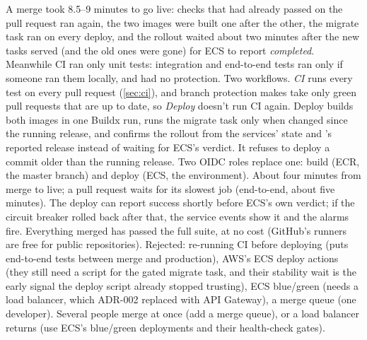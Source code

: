   {A merge took 8.5--9 minutes to go live: checks that had already passed on the pull request ran
   again, the two images were built one after the other, the migrate task ran on every deploy,
   and the rollout waited about two minutes after the new tasks served (and the old ones were
   gone) for ECS to report \emph{completed}. Meanwhile CI ran only unit tests: integration and
   end-to-end tests ran only if someone ran them locally, and  had no protection.}
  {Two workflows. \emph{CI} runs every test on every pull request (\cref{sec:ci}), and branch
   protection makes  take only green pull requests that are up to date, so
   \emph{Deploy} doesn't run CI again. Deploy builds both images in one Buildx run, runs the
   migrate task only when  changed since the running release, and confirms
   the rollout from the services' state and 's reported release instead of waiting
   for ECS's verdict. It refuses to deploy a commit older than the running release. Two OIDC
   roles replace one: build (ECR, the master branch) and deploy (ECS, the 
   environment).}
  {About four minutes from merge to live; a pull request waits for its slowest job (end-to-end,
   about five minutes). The deploy can report success shortly before ECS's own verdict; if the
   circuit breaker rolled back after that, the service events show it and the alarms fire.
   Everything merged has passed the full suite, at no cost (GitHub's runners are free for public
   repositories). Rejected: re-running CI before deploying (puts end-to-end tests between merge and
   production), AWS's ECS deploy actions (they still need a script for the gated migrate task, and
   their stability wait is the early signal the deploy script already stopped trusting), ECS blue/green
   (needs a load balancer, which ADR-002 replaced with API Gateway), a merge queue (one
   developer).}
  {Several people merge at once (add a merge queue), or a load balancer returns (use ECS's
   blue/green deployments and their health-check gates).}

